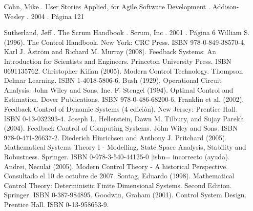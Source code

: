 \begin{thebibliography}{99}
 Cohn, Mike . User Stories Applied, for Agile Software Development . Addison-Wesley . 2004 . Página 121



 Sutherland, Jeff . The Scrum Handbook . Scrum, Inc . 2001 . Página 6
 William S. (1996). The Control Handbook. New York: CRC Press. ISBN 978-0-849-38570-4.
Karl J. Åström and Richard M. Murray (2008). Feedback Systems: An Introduction for Scientists and Engineers. Princeton University Press. ISBN 0691135762.
Christopher Kilian (2005). Modern Control Technology. Thompson Delmar Learning. ISBN 1-4018-5806-6.
 Bush (1929). Operational Circuit Analysis. John Wiley and Sons, Inc.
 F. Stengel (1994). Optimal Control and Estimation. Dover Publications. ISBN 978-0-486-68200-6.
 Franklin et al. (2002). Feedback Control of Dynamic Systems (4 edición). New Jersey: Prentice Hall. ISBN 0-13-032393-4.
 Joseph L. Hellerstein, Dawn M. Tilbury, and Sujay Parekh (2004). Feedback Control of Computing Systems. John Wiley and Sons. ISBN 978-0-471-26637-2.
 Diederich Hinrichsen and Anthony J. Pritchard (2005). Mathematical Systems Theory I - Modelling, State Space Analysis, Stability and Robustness. Springer. ISBN 0-978-3-540-44125-0 |isbn= incorrecto (ayuda).
 Andrei, Neculai (2005). Modern Control Theory - A historical Perspective. Consultado el 10 de octubre de 2007.
 Sontag, Eduardo (1998). Mathematical Control Theory: Deterministic Finite Dimensional Systems. Second Edition. Springer. ISBN 0-387-984895.
 Goodwin, Graham (2001). Control System Design. Prentice Hall. ISBN 0-13-958653-9.
\end{thebibliography}
